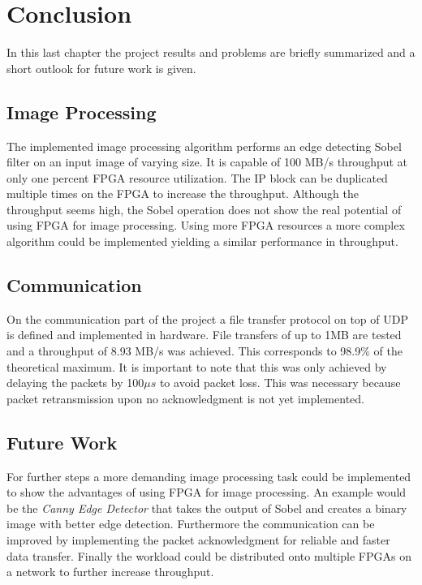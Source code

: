 %
%
\chapter{Conclusion}
In this last chapter the project results and problems are briefly summarized and
a short outlook for future work is given.

%
%
\section{Image Processing}
The implemented image processing algorithm performs an edge detecting Sobel
filter on an input image of varying size. It is capable of 100 MB/s
throughput at only one percent FPGA resource utilization. The IP block can be
duplicated multiple times on the FPGA to increase the throughput. Although the
throughput seems high, the Sobel operation does not show the real potential of
using FPGA for image processing. Using more FPGA resources a more complex
algorithm could be implemented yielding a similar performance in throughput.

%
%
\section{Communication}
On the communication part of the project a file transfer protocol on top of UDP
is defined and implemented in hardware. File transfers of up to 1MB are tested
and a throughput of 8.93 MB/s was achieved. This corresponds to 98.9\% of the
theoretical maximum. It is important to note that this was only achieved by
delaying the packets by 100$\mu s$ to avoid packet loss. This was necessary
because packet retransmission upon no acknowledgment is not yet implemented.

%
%
\section{Future Work}
For further steps a more demanding image processing task could be implemented to
show the advantages of using FPGA for image processing. An example would be the
\textit{Canny Edge Detector} that takes the output of Sobel and creates a binary
image with better edge detection. Furthermore the communication can be improved
by implementing the packet acknowledgment for reliable and faster data transfer.
Finally the workload could be distributed onto multiple FPGAs on a network
 to further increase throughput.
